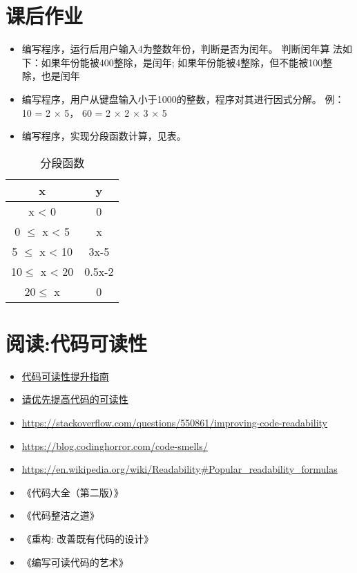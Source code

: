 \section{课后作业}
\begin{itemize}
\item 编写程序，运行后用户输入4为整数年份，判断是否为闰年。 判断闰年算
  法如下：如果年份能被400整除，是闰年; 如果年份能被4整除，但不能被100整
  除，也是闰年
\item 编写程序，用户从键盘输入小于1000的整数，程序对其进行因式分解。
  例： 10 = 2 × 5， 60 = 2 × 2 × 3 × 5
\item 编写程序，实现分段函数计算，见表。
\end{itemize}

\begin{table}
  \centering
  \begin{tabular}{cc}
    \toprule
    x           & y     \\
    \midrule
    x < 0       & 0     \\
    0 $\le$ x < 5  & x     \\
    5 $\le$ x < 10 & 3x-5  \\
    10$\le$ x < 20 & 0.5x-2\\
    20$\le$ x      & 0     \\
    \bottomrule
  \end{tabular}
  \caption{分段函数}%
  \label{segfunc}
\end{table}
\section{阅读:代码可读性}
\begin{itemize} 
\item \href{https://zhuanlan.zhihu.com/p/22334966}{代码可读性提升指南}
\item \href{http://blog.jobbole.com/73791/}{请优先提高代码的可读性}
\item \url{https://stackoverflow.com/questions/550861/improving-code-readability}
\item \url{https://blog.codinghorror.com/code-smells/}
\item \url{https://en.wikipedia.org/wiki/Readability#Popular_readability_formulas}
\item 《代码大全（第二版）》
\item 《代码整洁之道》
\item 《重构: 改善既有代码的设计》
\item 《编写可读代码的艺术》
\end{itemize}
